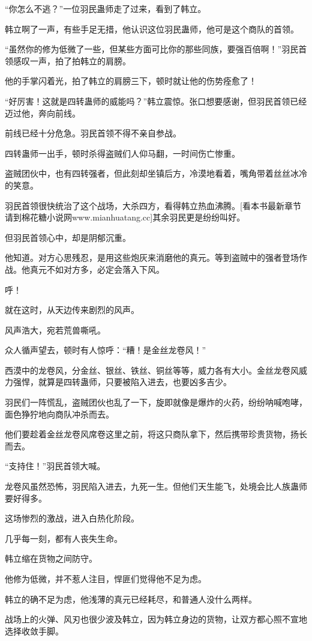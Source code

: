 \begin{this_body}
“你怎么不逃？”一位羽民蛊师走了过来，看到了韩立。

韩立啊了一声，有些手足无措，他认识这位羽民蛊师，他可是这个商队的首领。

“虽然你的修为低微了一些，但某些方面可比你的那些同族，要强百倍啊！”羽民首领感叹一声，拍了拍韩立的肩膀。

他的手掌闪着光，拍了韩立的肩膀三下，顿时就让他的伤势痊愈了！

“好厉害！这就是四转蛊师的威能吗？”韩立震惊。张口想要感谢，但羽民首领已经迈过他，奔向前线。

前线已经十分危急。羽民首领不得不亲自参战。

四转蛊师一出手，顿时杀得盗贼们人仰马翻，一时间伤亡惨重。

盗贼团伙中，也有四转强者，但此刻却坐镇后方，冷漠地看着，嘴角带着丝丝冰冷的笑意。

羽民首领很快统治了这个战场，大杀四方，看得韩立热血沸腾。[看本书最新章节请到棉花糖小说网www.mianhuatang.cc]其余羽民更是纷纷叫好。

但羽民首领心中，却是阴郁沉重。

他知道。对方心思残忍，是用这些炮灰来消磨他的真元。等到盗贼中的强者登场作战。他真元不如对方多，必定会落入下风。

呼！

就在这时，从天边传来剧烈的风声。

风声浩大，宛若荒兽嘶吼。

众人循声望去，顿时有人惊呼：“糟！是金丝龙卷风！”

西漠中的龙卷风，分金丝、银丝、铁丝、铜丝等等，威力各有大小。金丝龙卷风威力强悍，就算是四转蛊师，只要被陷入进去，也要凶多吉少。

羽民们一阵慌乱，盗贼团伙也乱了一下，旋即就像是爆炸的火药，纷纷呐喊咆哮，面色狰狞地向商队冲杀而去。

他们要趁着金丝龙卷风席卷这里之前，将这只商队拿下，然后携带珍贵货物，扬长而去。

“支持住！”羽民首领大喊。

龙卷风虽然恐怖，羽民陷入进去，九死一生。但他们天生能飞，处境会比人族蛊师要好得多。

这场惨烈的激战，进入白热化阶段。

几乎每一刻，都有人丧失生命。

韩立缩在货物之间防守。

他修为低微，并不惹人注目，悍匪们觉得他不足为虑。

韩立的确不足为虑，他浅薄的真元已经耗尽，和普通人没什么两样。

战场上的火弹、风刃也很少波及韩立，因为韩立身边的货物，让双方都心照不宣地选择收敛手脚。


\end{this_body}
